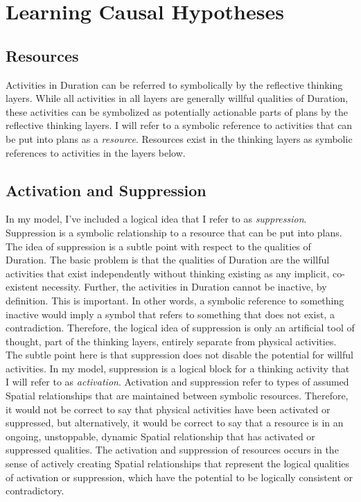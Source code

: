 \chapter{Learning Causal Hypotheses}
\label{chapter:learning_causal_hypotheses}

\section{Resources}

Activities in Duration can be referred to symbolically by the
reflective thinking layers.  While all activities in all layers are
generally willful qualities of Duration, these activities can be
symbolized as potentially actionable parts of plans by the reflective
thinking layers.  I will refer to a symbolic reference to activities
that can be put into plans as a \emph{resource}.  Resources exist in
the thinking layers as symbolic references to activities in the layers
below.

\section{Activation and Suppression}

In my model, I've included a logical idea that I refer to as
\emph{suppression}.  Suppression is a symbolic relationship to a
resource that can be put into plans.  The idea of suppression is a
subtle point with respect to the qualities of Duration.  The basic
problem is that the qualities of Duration are the willful activities
that exist independently without thinking existing as any implicit,
co-existent necessity.  Further, the activities in Duration cannot be
inactive, by definition.  This is important.  In other words, a
symbolic reference to something inactive would imply a symbol that
refers to something that does not exist, a contradiction.  Therefore,
the logical idea of suppression is only an artificial tool of thought,
part of the thinking layers, entirely separate from physical
activities.  The subtle point here is that suppression does not
disable the potential for willful activities.  In my model,
suppression is a logical block for a thinking activity that I will
refer to as \emph{activation}.  Activation and suppression refer to
types of assumed Spatial relationships that are maintained between
symbolic resources.  Therefore, it would not be correct to say that
physical activities have been activated or suppressed, but
alternatively, it would be correct to say that a resource is in an
ongoing, unstoppable, dynamic Spatial relationship that has activated
or suppressed qualities.  The activation and suppression of resources
occurs in the sense of actively creating Spatial relationships that
represent the logical qualities of activation or suppression, which
have the potential to be logically consistent or contradictory.

